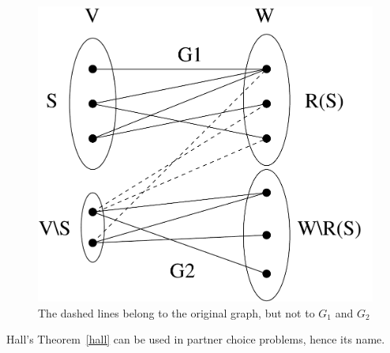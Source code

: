 \begin{figure}[h]
\begin{center}
\includegraphics[height=0.35\textheight,keepaspectratio]{hall}
\caption{The dashed lines belong to the original graph, but not to $G_1$ and $G_2$}\label{hallfig}
\end{center}
\end{figure}

Hall's Theorem~\ref{hall} can be used in partner choice problems, hence its name.







